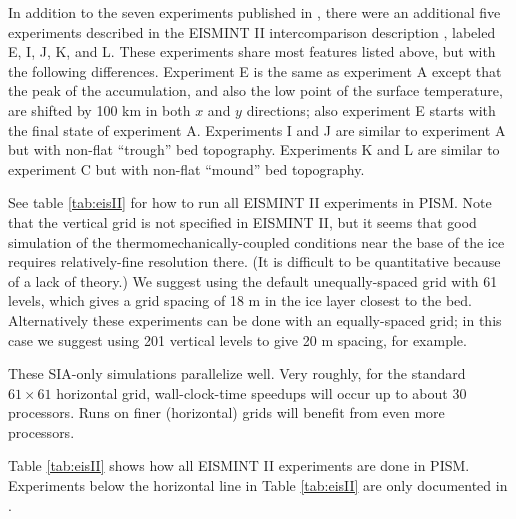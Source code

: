 In addition to the seven experiments published in \cite{EISMINT00}, there were an additional five experiments described in the EISMINT II intercomparison description 
\cite{EISIIdescribe}, labeled E, I, J, K, and L.  These experiments share most features listed above, but with the following differences.  Experiment E is the same as experiment A except that the peak of the accumulation, and also the low point of the surface temperature, are shifted by 100 km in both $x$ and $y$ directions; also experiment E starts with the final state of experiment A.  Experiments I and J are similar to experiment A but with non-flat ``trough'' bed topography.  Experiments K and L are similar to experiment C but with non-flat ``mound'' bed topography.

See table \ref{tab:eisII} for how to run all EISMINT II experiments in PISM.  Note that the vertical grid is not specified in EISMINT II, but it seems that good simulation of the thermomechanically-coupled conditions near the base of the ice requires relatively-fine resolution there.  (It is difficult to be quantitative because of a lack of theory.)  We suggest using the default unequally-spaced grid with 61 levels, which gives a grid spacing of 18 m in the ice layer closest to the bed.  Alternatively these experiments can be done with an equally-spaced grid; in this case we suggest using 201 vertical levels to give 20 m spacing, for example.

These SIA-only simulations parallelize well.  Very roughly, for the standard $61\times 61$ horizontal grid, wall-clock-time speedups will occur up to about 30 processors.  Runs on finer (horizontal) grids will benefit from even more processors.

Table \ref{tab:eisII} shows how all EISMINT II experiments are done in PISM.  Experiments below the horizontal line in Table \ref{tab:eisII} are only documented in \cite{EISIIdescribe}.

